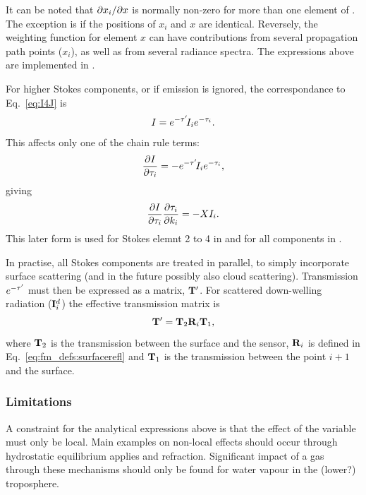 It can be noted that $\partial x_i/\partial x$ is normally non-zero for more than
one element of \SttVct. The exception is if the positions of $x_i$ and $x$ are
identical. Reversely, the weighting function for element $x$ can have
contributions from several propagation path points ($x_i$), as well as from
several radiance spectra.
The expressions above are implemented in .

For higher Stokes components, or if emission is ignored, the correspondance to
Eq.~\ref{eq:I4J} is
\begin{equation}
  \label{eq:Q4J}
  I = e^{-\tau'}\!I_ie^{-\tau_{i}}.
\end{equation}
This affects only one of the chain rule terms:
\begin{equation}
  \frac{\partial I}{\partial \tau_{i}} 
      = -e^{-\tau'}\!I_i e^{-\tau_{i}},
\end{equation}
giving
\begin{equation}
  \frac{\partial I}{\partial \tau_{i}}\frac{\partial \tau_{i}}{\partial k_i} =
  -X I_i.
\end{equation}
This later form is used for Stokes elemnt 2 to 4 in
 and for all components in
.

In practise, all Stokes components are treated in parallel, to simply
incorporate surface scattering (and in the future possibly also cloud
scattering). Transmission $e^{-\tau'}$ must then be expressed as a matrix,
$\mathbf{T}'$. For scattered down-welling radiation (${\bf I}^d_i$) the
effective transmission matrix is
\begin{equation}
  \mathbf{T}' = \mathbf{T}_2\mathbf{R}_i\mathbf{T}_1,
\end{equation}
where $\mathbf{T}_2$ is the transmission between the surface and the sensor,
$\mathbf{R}_i$ is defined in Eq.~\ref{eq:fm_defs:surfacerefl} and
$\mathbf{T}_1$ is the transmission between the point $i+1$ and the surface.


\subsubsection{Limitations}
%
A constraint for the analytical expressions above is that the effect of the
variable must only be local. Main examples on non-local effects should occur
through hydrostatic equilibrium applies and refraction. Significant impact of a
gas through these mechanisms should only be found for water vapour in the
(lower?) troposphere.





